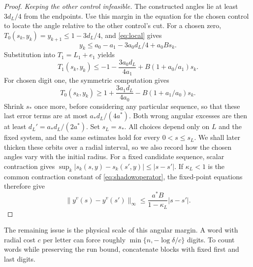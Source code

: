 \documentclass[11pt]{amsart}
\theoremstyle{definition}
\theoremstyle{remark}
\numberwithin{equation}{section}
\begin{document}
\begin{proof}
\smallskip
\emph{Keeping the other control infeasible.}
The constructed angles lie at least $3d_L/4$ from the endpoints.
Use this margin in the equation for the chosen control to locate
the angle relative to the other control's cut. For a chosen zero,
\(T_0(s_k,y_k)=y_{k+1}\le1-3d_L/4\), and \eqref{eq:local} gives
\[
 y_k\le a_0-a_1-3a_0d_L/4+a_0Bs_k.
\]
Substitution into \(T_1=L_1+e_1\) yields
\[
 T_1(s_k,y_k)\le-1-\frac{3a_0d_L}{4a_1}
                           +B(1+a_0/a_1)s_k.
\]
For chosen digit one, the symmetric computation gives
\[
 T_0(s_k,y_k)\ge1+\frac{3a_1d_L}{4a_0}
                           -B(1+a_1/a_0)s_k.
\]
Shrink \(s_*\) once more, before considering any particular sequence,
so that these last error terms are at most
\(a_*d_L/(4a^*)\). Both wrong angular excesses are then at least
\(d_L'=a_*d_L/(2a^*)\). Set \(s_L=s_*\).
All choices depend only on $L$ and the fixed system, and the same
estimates hold for every $0<s\le s_L$. We shall later thicken
these orbits over a radial interval, so we also record how the
chosen angles vary with the initial radius.
For a fixed candidate sequence, scalar contraction gives
$\sup_k|s_k(s,y)-s_k(s',y)|\le|s-s'|$.
If $\kappa_L<1$ is the common contraction constant of
\eqref{eq:shadowoperator}, the fixed-point equations therefore give
\begin{equation}\label{eq:shadowcontinuous}
\|y^v(s)-y^v(s')\|_\infty
 \le\frac{a^*B}{1-\kappa_L}|s-s'|.
\end{equation}
\end{proof}

The remaining issue is the physical scale of this angular margin.
A word with radial cost $c$ per letter can force roughly
$\min\{n,-\log\delta/c\}$ digits. To count words while preserving
the run bound, concatenate blocks with fixed first and last digits.
\end{document}
